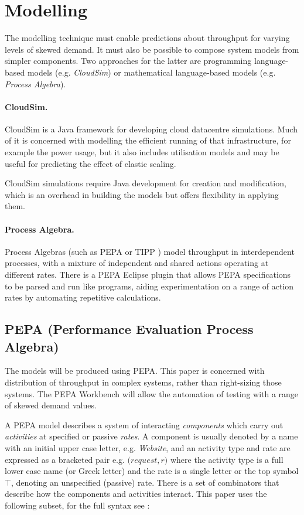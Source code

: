 \section{Modelling}\label{sec:modelling}

The modelling technique must enable predictions about throughput for varying levels of skewed demand.  It must also be possible to compose system models from simpler components.  Two approaches for the latter are programming language-based models (e.g. {\itshape CloudSim}) or mathematical language-based models (e.g. {\itshape Process Algebra}).

\paragraph{CloudSim.} CloudSim \cite{RN69} is a Java framework for developing cloud datacentre simulations.  Much of it is concerned with modelling the efficient running of that infrastructure, for example the power usage, but it also includes utilisation models and may be useful for predicting the effect of elastic scaling.

CloudSim simulations require Java development for creation and modification, which is an overhead in building the models but offers flexibility in applying them.

\paragraph{Process Algebra.} Process Algebras (such as PEPA or TIPP \cite{RN64}) model throughput in interdependent processes, with a mixture of independent and shared actions operating at different rates.  There is a PEPA Eclipse plugin \cite{RN1080} that allows PEPA specifications to be parsed and run like programs, aiding experimentation on a range of action rates by automating repetitive calculations.

\subsection{PEPA (Performance Evaluation Process Algebra)}

The models will be produced using PEPA.  This paper is concerned with distribution of throughput in complex systems, rather than right-sizing those systems.  The PEPA Workbench will allow the automation of testing with a range of skewed demand values.

A PEPA model describes a system of interacting {\itshape components} which carry out {\itshape activities} at specified or passive {\itshape rates}.  A component is usually denoted by a name with an initial upper case letter, e.g. {\itshape Website}, and an activity type and rate are expressed as a bracketed pair e.g. $\mathit(request, r)$ where the activity type is a full lower case name (or Greek letter) and the rate is a single letter or the top symbol $\top$, denoting an unspecified (passive) rate.  There is a set of combinators that describe how the components and activities interact.  This paper uses the following subset, for the full syntax see {\cite{RN1051}}:

